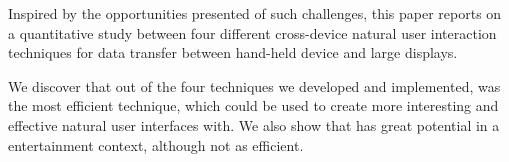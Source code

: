 Inspired by the opportunities presented of such challenges, this paper reports on a quantitative study between four different cross-device natural user interaction techniques for data transfer between hand-held device and large displays.

We discover that out of the four techniques we developed and implemented, \swipe was the most efficient technique, which could be used to create more interesting and effective natural user interfaces with. We also show that \pinch has great potential in a entertainment context, although not as efficient. 

